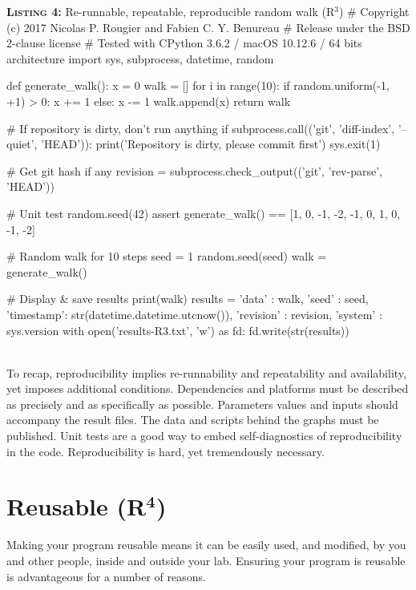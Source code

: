 \documentclass[a4paper,11pt]{article}
\begin{document}
\noindent \begin{minipage}[c]{\linewidth}
\begin{code}{\textbf{\textsc{Listing 4:}} Re-runnable, repeatable, reproducible random walk (R$^3$)}
# Copyright (c) 2017 Nicolas P. Rougier and Fabien C. Y. Benureau
# Release under the BSD 2-clause license
# Tested with CPython 3.6.2 / macOS 10.12.6 / 64 bits architecture
import sys, subprocess, datetime, random

def generate_walk():
    x = 0
    walk = []
    for i in range(10):
        if random.uniform(-1, +1) > 0:
            x += 1
        else:
            x -= 1
        walk.append(x)
    return walk

# If repository is dirty, don't run anything
if subprocess.call(('git', 'diff-index', '--quiet', 'HEAD')):
    print('Repository is dirty, please commit first')
    sys.exit(1)

# Get git hash if any
revision = subprocess.check_output(('git', 'rev-parse', 'HEAD'))

# Unit test
random.seed(42)
assert generate_walk() == [1, 0, -1, -2, -1, 0, 1, 0, -1, -2]

# Random walk for 10 steps
seed = 1
random.seed(seed)
walk = generate_walk()

# Display & save results
print(walk)
results = {'data'       : walk,
            'seed'      : seed,
            'timestamp': str(datetime.datetime.utcnow()),
            'revision' : revision,
            'system'    : sys.version}
with open('results-R3.txt', 'w') as fd:
    fd.write(str(results))
\end{code}
\end{minipage}\\

To recap, reproducibility implies re-runnability and repeatability and availability, yet imposes additional conditions. Dependencies and platforms must be described as precisely and as specifically as possible. Parameters values and inputs should accompany the result files. The data and scripts behind the graphs must be published. Unit tests are a good way to embed self-diagnostics of reproducibility in the code. Reproducibility is hard, yet tremendously necessary.


\section*{Reusable (R$^{\mathbf 4}$)}

Making your program reusable means it can be easily used, and modified, by you and other people, inside and outside your lab. Ensuring your program is reusable is advantageous for a number of reasons.\\
\end{document}
